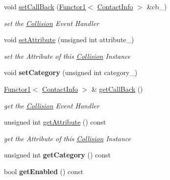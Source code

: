\begin{DoxyCompactItemize}
void \hyperlink{class_magnum_1_1_collision_a4ec805eb2d9b1314b3c470f4f014f556}{set\+Call\+Back} (\hyperlink{class_magnum_1_1_functor1}{Functor1}$<$ \hyperlink{class_magnum_1_1_collision_1_1_contact_info}{Contact\+Info} $>$ \&cb\+\_\+)
\begin{DoxyCompactList}\small\item\em set the \hyperlink{class_magnum_1_1_collision}{Collision} Event Handler \end{DoxyCompactList}\item 
void \hyperlink{class_magnum_1_1_collision_abaf472ab7f1f151f966cfbc1d55fe9aa}{set\+Attribute} (unsigned int attribute\+\_\+)
\begin{DoxyCompactList}\small\item\em set the Attribute of this \hyperlink{class_magnum_1_1_collision}{Collision} Instance \end{DoxyCompactList}\item 
void {\bfseries set\+Category} (unsigned int category\+\_\+)\hypertarget{class_magnum_1_1_collision_af07546b0296e34c1fc24adc166692c23}{}\label{class_magnum_1_1_collision_af07546b0296e34c1fc24adc166692c23}

\item 
\hyperlink{class_magnum_1_1_functor1}{Functor1}$<$ \hyperlink{class_magnum_1_1_collision_1_1_contact_info}{Contact\+Info} $>$ \& \hyperlink{class_magnum_1_1_collision_a41da4846e87ddc84006ce4155f1bd4f6}{get\+Call\+Back} ()
\begin{DoxyCompactList}\small\item\em get the \hyperlink{class_magnum_1_1_collision}{Collision} Event Handler \end{DoxyCompactList}\item 
unsigned int \hyperlink{class_magnum_1_1_collision_a87ca313908483a7ea68d0f5e22242567}{get\+Attribute} () const 
\begin{DoxyCompactList}\small\item\em get the Attribute of this \hyperlink{class_magnum_1_1_collision}{Collision} Instance \end{DoxyCompactList}\item 
unsigned int {\bfseries get\+Category} () const \hypertarget{class_magnum_1_1_collision_a4b65edb40ad1803c6d39986617575a4d}{}\label{class_magnum_1_1_collision_a4b65edb40ad1803c6d39986617575a4d}

\item 
bool {\bfseries get\+Enabled} () const \hypertarget{class_magnum_1_1_collision_aa8e71c31006f4f13d8c3976605a68065}{}\label{class_magnum_1_1_collision_aa8e71c31006f4f13d8c3976605a68065}


\end{DoxyCompactItemize}
